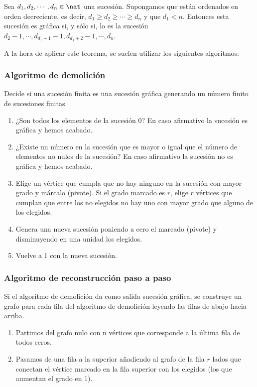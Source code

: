\begin{nth}
    Sea $d_1,d_2,\cdots,d_n \in \nat$ una sucesión. Supongamos que están ordenados en orden decreciente, es decir, $d_1 \geq d_2 \geq \cdots \geq d_n$ y que $d_1 < n$.
    Entonces esta sucesión es gráfica si, y sólo si, lo es la sucesión $d_2 -1, \cdots, d_{d_1+1}-1, d_{d_1+2}-1, \cdots, d_n$.
\end{nth}

A la hora de aplicar este teorema, se suelen utilizar los siguientes algoritmos:

\subsubsection{Algoritmo de demolición}
Decide si una sucesión finita es una sucesión gráfica generando un número finito de sucesiones finitas.
\begin{enumerate}
    \item ¿Son todos los elementos de la sucesión 0? En caso afirmativo la sucesión es gráfica y hemos acabado.
    \item ¿Existe un número en la sucesión que es mayor o igual que el número de elementos no nulos de la sucesión? En caso afirmativo la sucesión no es gráfica y hemos acabado.
    \item Elige un vértice que cumpla que no hay ninguno en la sucesión con mayor grado y márcalo (pivote). Si el grado marcado es $r$, elige $r$ vértices que cumplan que entre los no elegidos no hay uno con mayor grado que alguno de los elegidos.
    \item Genera una nueva sucesión poniendo a cero el marcado (pivote) y disminuyendo en una unidad los elegidos.
    \item Vuelve a 1 con la nueva sucesión.
\end{enumerate}

\subsubsection{Algoritmo de reconstrucción paso a paso}
Si el algoritmo de demolición da como salida sucesión gráfica, se construye un grafo para cada fila del algoritmo de demolición leyendo las filas de abajo hacia arriba.
\begin{enumerate}
    \item Partimos del grafo nulo con n vértices que corresponde a la última fila de todos ceros.
    \item Pasamos de una fila a la superior añadiendo al grafo de la fila $r$ lados que conectan el vértice marcado en la fila superior con los elegidos (los que aumentan el grado en 1).
\end{enumerate}

